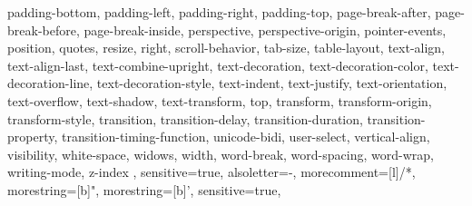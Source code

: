 {{    padding-bottom, padding-left, padding-right, padding-top, 
    page-break-after, page-break-before, page-break-inside, perspective, 
    perspective-origin, pointer-events, position, quotes, resize, 
    right, scroll-behavior, tab-size, table-layout, text-align, 
    text-align-last, text-combine-upright, text-decoration, 
    text-decoration-color, text-decoration-line, text-decoration-style, 
    text-indent, text-justify, text-orientation, text-overflow, 
    text-shadow, text-transform, top, transform, transform-origin, 
    transform-style, transition, transition-delay, 
    transition-duration, transition-property, transition-timing-function, 
    unicode-bidi, user-select, vertical-align, visibility, 
    white-space, widows, width, word-break, word-spacing, word-wrap, 
    writing-mode, z-index
  },
  sensitive=true, %
  alsoletter={-}, %
  morecomment=[l]{/*}, %
  morestring=[b]", %
  morestring=[b]',
  sensitive=true, %
}



  